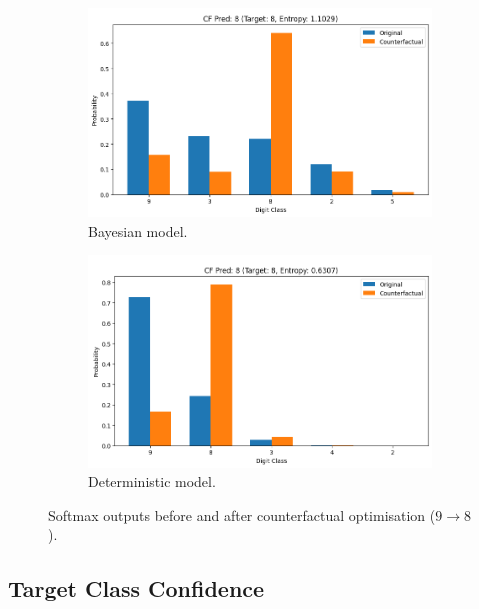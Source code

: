 \documentclass{article}
\begin{document}
\begin{figure}[H]
    \centering
    \begin{subfigure}{0.48\textwidth}
        \centering
        \includegraphics[width=\textwidth]{figures/Class/9to8_Bayes_distribution.png}
        \caption{Bayesian model.}
        \label{fig:cc_qualitative_bayesian_9to8}
    \end{subfigure}
    \hfill
    \begin{subfigure}{0.48\textwidth}
        \centering
        \includegraphics[width=\textwidth]{figures/Class/9to8_Det_distribution.png}
        \caption{Deterministic model.}
        \label{fig:cc_qualitative_det_9to8}
    \end{subfigure}
    \caption{Softmax outputs before and after counterfactual optimisation ($9 \rightarrow 8$).}
    \label{fig:cc_qualitative_distribution_9to8}
\end{figure}




\subsection{Target Class Confidence}
\end{document}
